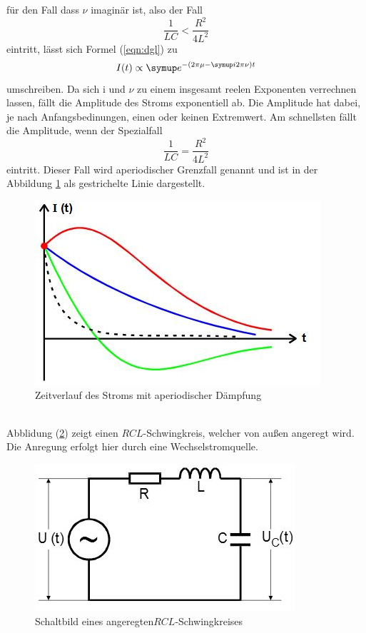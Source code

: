 für den Fall dass $\nu$ imaginär ist, also der Fall
\begin{equation*}
  \frac{1}{LC} < \frac{R^2}{4L^2}
\end{equation*}
eintritt, lässt sich Formel (\ref{eqn:dgl}) zu
\begin{equation}
  I(t)\propto\su{e}^{-(2\pi\mu -\su{i}2\pi\nu)t}
\end{equation}
umschreiben.
Da sich i und $\nu$ zu einem insgesamt reelen Exponenten verrechnen lassen, fällt
die Amplitude des Stroms exponentiell ab. Die Amplitude hat dabei, je nach
Anfangsbedinungen, einen oder keinen Extremwert. Am schnellsten fällt die
Amplitude, wenn der Spezialfall
\begin{equation*}
  \frac{1}{LC} = \frac{R^2}{4L^2}
\end{equation*}
eintritt. Dieser Fall wird aperiodischer Grenzfall genannt und ist in der
Abbildung \ref{fig:agf} als gestrichelte Linie dargestellt.
\begin{figure}[h]
  \centering
  \includegraphics{Bilder/aperiod.JPG}
  \caption{Zeitverlauf des Stroms mit aperiodischer Dämpfung\cite{354}}
  \label{fig:agf}
\end{figure}
\\
Abblidung (\ref{fig:angeregt}) zeigt einen $RCL$-Schwingkreis, welcher von
außen angeregt wird. Die Anregung erfolgt hier durch eine Wechselstromquelle.
\begin{figure}[h]
  \centering
  \includegraphics{Bilder/angeregt.JPG}
  \caption{Schaltbild eines angeregten$RCL$-Schwingkreises}
  \label{fig:angeregt}
\end{figure}
